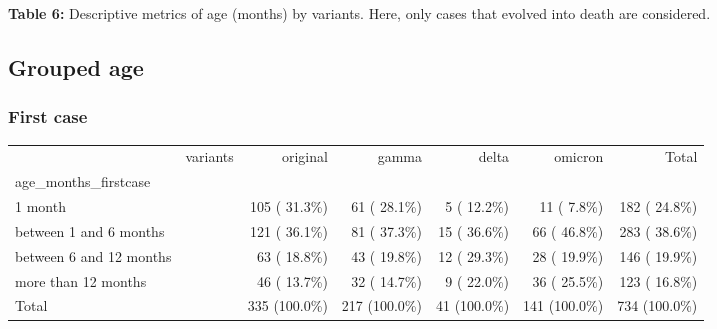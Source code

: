 \documentclass[
]{article}
\newenvironment{Shaded}{\begin{snugshade}}{\end{snugshade}}
\newcommand{\AttributeTok}[1]{\textcolor[rgb]{0.77,0.63,0.00}{#1}}
\newcommand{\ConstantTok}[1]{\textcolor[rgb]{0.00,0.00,0.00}{#1}}
\newcommand{\DocumentationTok}[1]{\textcolor[rgb]{0.56,0.35,0.01}{\textbf{\textit{#1}}}}
\newcommand{\FunctionTok}[1]{\textcolor[rgb]{0.00,0.00,0.00}{#1}}
\newcommand{\NormalTok}[1]{#1}
\newcommand{\SpecialCharTok}[1]{\textcolor[rgb]{0.00,0.00,0.00}{#1}}
\newcommand{\StringTok}[1]{\textcolor[rgb]{0.31,0.60,0.02}{#1}}
\renewenvironment{Shaded}{\begin{mdframed}[ backgroundcolor=shadecolor, linecolor = shadecolor, leftmargin=\dimexpr\leftmargin-2pt\relax, innerleftmargin=1.6pt, innertopmargin=5pt, skipabove=10pt,skipbelow=3pt ]}{\end{mdframed}}
\begin{document}
\textbf{Table 6:} Descriptive metrics of age (months) by variants. Here,
only cases that evolved into death are considered.

\hypertarget{grouped-age-1}{%
\subsection{Grouped age}\label{grouped-age-1}}

\hypertarget{first-case-1}{%
\subsubsection{First case}\label{first-case-1}}

\begin{Shaded}
\end{Shaded}

\begin{longtable}[]{@{}lrrrrrr@{}}
\toprule()
\endhead
& variants & original & gamma & delta & omicron & Total \\
age\_months\_firstcase & & & & & & \\
1 month & & 105 ( 31.3\%) & 61 ( 28.1\%) & 5 ( 12.2\%) & 11 ( 7.8\%) &
182 ( 24.8\%) \\
between 1 and 6 months & & 121 ( 36.1\%) & 81 ( 37.3\%) & 15 ( 36.6\%) &
66 ( 46.8\%) & 283 ( 38.6\%) \\
between 6 and 12 months & & 63 ( 18.8\%) & 43 ( 19.8\%) & 12 ( 29.3\%) &
28 ( 19.9\%) & 146 ( 19.9\%) \\
more than 12 months & & 46 ( 13.7\%) & 32 ( 14.7\%) & 9 ( 22.0\%) & 36 (
25.5\%) & 123 ( 16.8\%) \\
Total & & 335 (100.0\%) & 217 (100.0\%) & 41 (100.0\%) & 141 (100.0\%) &
734 (100.0\%) \\
\bottomrule()
\end{longtable}
\end{document}
